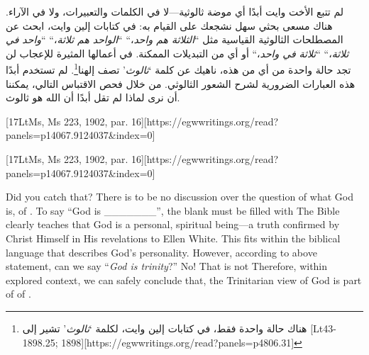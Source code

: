 لم تتبع الأخت وايت أبدًا أي موضة ثالوثية—لا في الكلمات والتعبيرات، ولا في الآراء. هناك مسعى بحثي سهل نشجعك على القيام به: في كتابات إلين وايت، ابحث عن المصطلحات الثالوثية القياسية مثل “\textit{الثلاثة هم واحد}،“ “\textit{الواحد هم ثلاثة}،“ “\textit{واحد في ثلاثة}،“ “\textit{ثلاثة في واحد}،“ أو أي من التبديلات الممكنة. في أعمالها المثيرة للإعجاب لن تجد حالة واحدة من أي من هذه، ناهيك عن كلمة ‘\textit{ثالوث}’ تصف إلهنا\footnote{هناك حالة واحدة فقط، في كتابات إلين وايت، لكلمة ‘\textit{ثالوث}’ تشير إلى [Lt43-1898.25; 1898][https://egwwritings.org/read?panels=p4806.31]}. لم تستخدم أبدًا هذه العبارات الضرورية لشرح الشعور الثالوثي. من خلال فحص الاقتباس التالي، يمكننا أن نرى لماذا لم تقل أبدًا أن الله هو ثالوث.


[17LtMs, Ms 223, 1902, par. 16][https://egwwritings.org/read?panels=p14067.9124037&index=0]


[17LtMs, Ms 223, 1902, par. 16][https://egwwritings.org/read?panels=p14067.9124037&index=0]


Did you catch that? There is to be no discussion over the question of what God is,  of . To say “God is \_\_\_\_\_\_\_”, the blank must be filled with  The Bible clearly teaches that God is a personal, spiritual being—a truth confirmed by Christ Himself in His revelations to Ellen White. This fits within the biblical language that describes God’s personality. However, according to above statement, can we say “\textit{God is trinity}?” No! That is not  Therefore, within explored context, we can safely conclude that, the Trinitarian view of God is part of  of .


